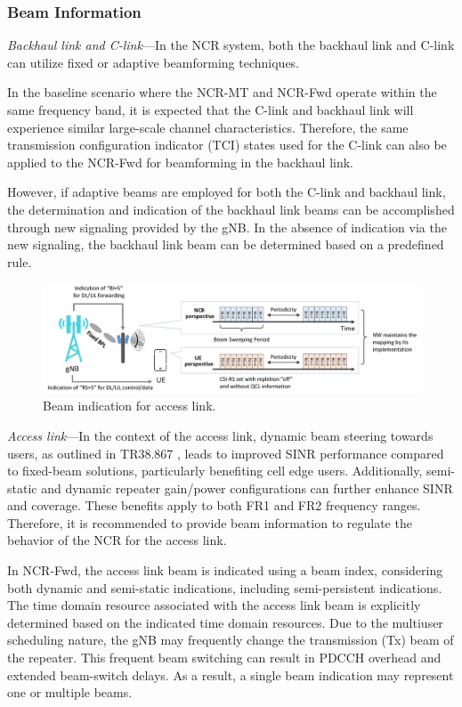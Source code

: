 \documentclass[lettersize,journal]{IEEEtran}
\begin{document}
\subsubsection{Beam Information}

\emph{Backhaul link and C-link}---In the NCR system, both the backhaul link and C-link can utilize fixed or adaptive beamforming techniques.

In the baseline scenario where the NCR-MT and NCR-Fwd operate within the same frequency band, it is expected that the C-link and backhaul link will experience similar large-scale channel characteristics. Therefore, the same transmission configuration indicator (TCI) states used for the C-link can also be applied to the NCR-Fwd for beamforming in the backhaul link.

However, if adaptive beams are employed for both the C-link and backhaul link, the determination and indication of the backhaul link beams can be accomplished through new signaling provided by the gNB. In the absence of indication via the new signaling, the backhaul link beam can be determined based on a predefined rule.


\begin{figure}
\centering
\includegraphics[width=7.0in]{Figs/Beam_Indication.jpg}
\caption{Beam indication for access link.}
\label{fig:Beam_Indication}
\end{figure}

\emph{Access link}---In the context of the access link, dynamic beam steering towards users, as outlined in TR38.867 \cite{3GPP-38-867}, leads to improved SINR performance compared to fixed-beam solutions, particularly benefiting cell edge users. Additionally, semi-static and dynamic repeater gain/power configurations can further enhance SINR and coverage. These benefits apply to both FR1 and FR2 frequency ranges. Therefore, it is recommended to provide beam information to regulate the behavior of the NCR for the access link.

In NCR-Fwd, the access link beam is indicated using a beam index, considering both dynamic and semi-static indications, including semi-persistent indications. The time domain resource associated with the access link beam is explicitly determined based on the indicated time domain resources. Due to the multiuser scheduling nature, the gNB may frequently change the transmission (Tx) beam of the repeater. This frequent beam switching can result in PDCCH overhead and extended beam-switch delays. As a result, a single beam indication may represent one or multiple beams.
\end{document}
